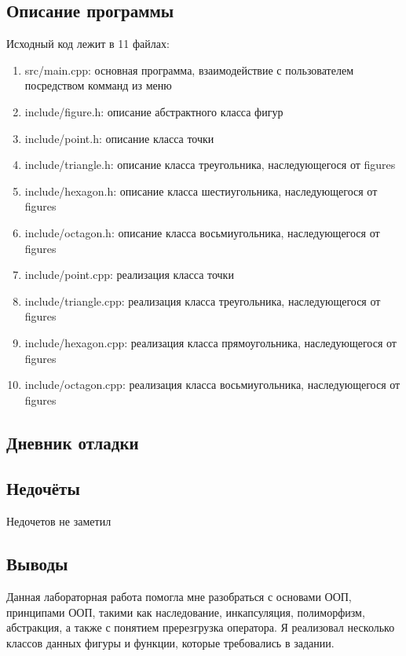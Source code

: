 \documentclass[12pt]{article}
\begin{document}
\subsection*{Описание программы}

Исходный код лежит в 11 файлах:
\begin{enumerate}
\item src/main.cpp: основная программа, взаимодействие с пользователем посредством комманд из меню

\item include/figure.h:    описание абстрактного класса фигур

\item include/point.h:     описание класса точки
\item include/triangle.h:  описание класса треугольника, наследующегося от figures
\item include/hexagon.h: описание класса шестиугольника, наследующегося от figures
\item include/octagon.h:    описание класса восьмиугольника, наследующегося от figures

\item include/point.cpp:     реализация класса точки
\item include/triangle.cpp:  реализация класса треугольника, наследующегося от figures
\item include/hexagon.cpp: реализация класса прямоугольника, наследующегося от figures
\item include/octagon.cpp:    реализация класса восьмиугольника, наследующегося от figures

\end{enumerate}

\subsection*{Дневник отладки}


\subsection*{Недочёты}
Недочетов не заметил

\subsection*{Выводы}
Данная лабораторная работа помогла мне разобраться с основами ООП, принципами ООП, такими как наследование, инкапсуляция, полиморфизм, абстракция, а также с понятием пререзгрузка оператора. Я реализовал несколько классов данных фигуры и функции, которые требовались в задании.
\end{document}

